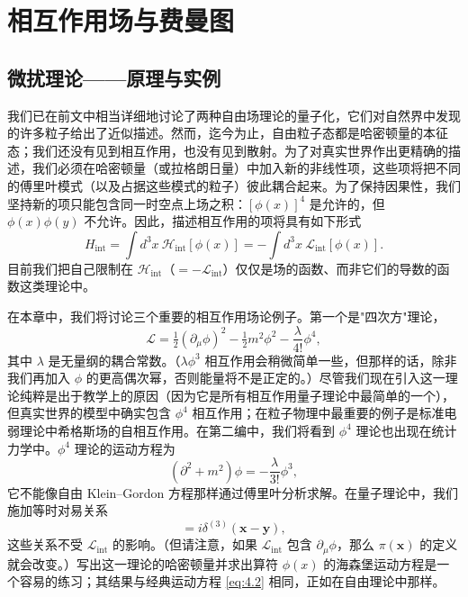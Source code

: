 \chapter{相互作用场与费曼图}

\section{微扰理论——原理与实例}

我们已在前文中相当详细地讨论了两种自由场理论的量子化，它们对自然界中发现的许多粒子给出了近似描述。然而，迄今为止，自由粒子态都是哈密顿量的本征态；我们还没有见到相互作用，也没有见到散射。为了对真实世界作出更精确的描述，我们必须在哈密顿量（或拉格朗日量）中加入新的非线性项，这些项将把不同的傅里叶模式（以及占据这些模式的粒子）彼此耦合起来。为了保持因果性，我们坚持新的项只能包含同一时空点上场之积：$[\phi(x)]^4$ 是允许的，但 $\phi(x)\phi(y)$ 不允许。因此，描述相互作用的项将具有如下形式
\begin{equation}
  H_{\mathrm{int}} = \int d^3x\ \mathcal{H}_{\mathrm{int}}[\phi(x)]
  = -\int d^3x\ \mathcal{L}_{\mathrm{int}}[\phi(x)] .
\end{equation}
目前我们把自己限制在 $\mathcal{H}_{\mathrm{int}}$（$= -\mathcal{L}_{\mathrm{int}}$）仅仅是场的函数、而非它们的导数的函数这类理论中。

在本章中，我们将讨论三个重要的相互作用场论例子。第一个是"四次方"理论，
\begin{equation}
  \mathcal{L} = \tfrac{1}{2}(\partial_\mu\phi)^2 - \tfrac{1}{2}m^2\phi^2
    - \frac{\lambda}{4!}\phi^4 ,
  \label{eq:4.1}
\end{equation}
其中 $\lambda$ 是无量纲的耦合常数。（$\lambda\phi^3$ 相互作用会稍微简单一些，但那样的话，除非我们再加入 $\phi$ 的更高偶次幂，否则能量将不是正定的。）尽管我们现在引入这一理论纯粹是出于教学上的原因（因为它是所有相互作用量子理论中最简单的一个），但真实世界的模型中确实包含 $\phi^4$ 相互作用；在粒子物理中最重要的例子是标准电弱理论中希格斯场的自相互作用。在第二编中，我们将看到 $\phi^4$ 理论也出现在统计力学中。$\phi^4$ 理论的运动方程为
\begin{equation}
  (\partial^2 + m^2)\phi = -\frac{\lambda}{3!}\phi^3,
  \label{eq:4.2}
\end{equation}
它不能像自由 Klein--Gordon 方程那样通过傅里叶分析求解。在量子理论中，我们施加等时对易关系
\begin{equation}
  [\phi(\mathbf{x}), \pi(\mathbf{y})] = i\delta^{(3)}(\mathbf{x}-\mathbf{y}),
\end{equation}
这些关系不受 $\mathcal{L}_{\mathrm{int}}$ 的影响。（但请注意，如果 $\mathcal{L}_{\mathrm{int}}$ 包含 $\partial_\mu\phi$，那么 $\pi(\mathbf{x})$ 的定义就会改变。）写出这一理论的哈密顿量并求出算符 $\phi(x)$ 的海森堡运动方程是一个容易的练习；其结果与经典运动方程 \eqref{eq:4.2} 相同，正如在自由理论中那样。

